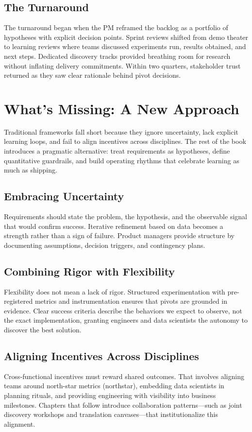 \subsection{The Turnaround}
The turnaround began when the PM reframed the backlog as a portfolio of hypotheses with explicit decision points. Sprint reviews shifted from demo theater to learning reviews where teams discussed experiments run, results obtained, and next steps. Dedicated discovery tracks provided breathing room for research without inflating delivery commitments. Within two quarters, stakeholder trust returned as they saw clear rationale behind pivot decisions.

\section{What's Missing: A New Approach}
\label{sec:new-approach}

Traditional frameworks fall short because they ignore uncertainty, lack explicit learning loops, and fail to align incentives across disciplines. The rest of the book introduces a pragmatic alternative: treat requirements as hypotheses, define quantitative guardrails, and build operating rhythms that celebrate learning as much as shipping.

\subsection{Embracing Uncertainty}
Requirements should state the problem, the hypothesis, and the observable signal that would confirm success. Iterative refinement based on data becomes a strength rather than a sign of failure. Product managers provide structure by documenting assumptions, decision triggers, and contingency plans.

\subsection{Combining Rigor with Flexibility}
Flexibility does not mean a lack of rigor. Structured experimentation with pre-registered metrics and instrumentation ensures that pivots are grounded in evidence. Clear success criteria describe the behaviors we expect to observe, not the exact implementation, granting engineers and data scientists the autonomy to discover the best solution.

\subsection{Aligning Incentives Across Disciplines}
Cross-functional incentives must reward shared outcomes. That involves aligning teams around north-star metrics (\gls{northstar}), embedding data scientists in planning rituals, and providing engineering with visibility into business milestones. Chapters that follow introduce collaboration patterns—such as joint discovery workshops and translation canvases—that institutionalize this alignment.


